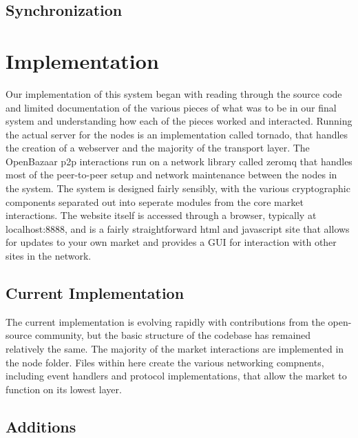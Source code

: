 \documentclass[12pt,twocolumn]{article}
\begin{document}
\subsection{Synchronization}



\section{Implementation}
Our implementation of this system began with reading through the source code and limited documentation of the various pieces of what was to be in our final system and understanding how each of the pieces worked and interacted. Running the actual server for the nodes is an implementation called tornado, that handles the creation of a webserver and the majority of the transport layer. The OpenBazaar p2p interactions run on a network library called zeromq that handles most of the peer-to-peer setup and network maintenance between the nodes in the system. The system is designed fairly sensibly, with the various cryptographic components separated out into seperate modules from the core market interactions. The website itself is accessed through a browser, typically at {{\sc localhost:8888}}, and is a fairly straightforward html and javascript site that allows for updates to your own market and provides a GUI for interaction with other sites in the network.

\subsection{Current Implementation}
The current implementation is evolving rapidly with contributions from the open-source community, but the basic structure of the codebase has remained relatively the same. The majority of the market interactions are implemented in the node folder. Files within here create the various networking compnents, including event handlers and protocol implementations, that allow the market to function on its lowest layer. 

\subsection{Additions}

\newcommand{\Twisted}{}
\def\Twisted/{{\sc Twisted}}
\newcommand{\Tornado}{}
\def\Tornado/{{\sc Tornado}}
\newcommand{\Entangled}{}
\def\Entangled/{{\sc Entangled}}
\end{document}
